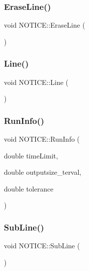 \subsubsection{\texorpdfstring{Erase\+Line()}{EraseLine()}}
{\footnotesize\ttfamily void N\+O\+T\+I\+C\+E\+::\+Erase\+Line (\begin{DoxyParamCaption}{ }\end{DoxyParamCaption})\hspace{0.3cm}{\ttfamily [inline]}}

\mbox{\label{namespace_n_o_t_i_c_e_a9536e3b7bb1f9b6af83b1a5cdf3a56d3}} 
\subsubsection{\texorpdfstring{Line()}{Line()}}
{\footnotesize\ttfamily void N\+O\+T\+I\+C\+E\+::\+Line (\begin{DoxyParamCaption}{ }\end{DoxyParamCaption})\hspace{0.3cm}{\ttfamily [inline]}}

\mbox{\label{namespace_n_o_t_i_c_e_ab85b7138c5f1deaeeedad94b7bad2477}} 
\subsubsection{\texorpdfstring{Run\+Info()}{RunInfo()}}
{\footnotesize\ttfamily void N\+O\+T\+I\+C\+E\+::\+Run\+Info (\begin{DoxyParamCaption}\item[{double}]{time\+Limit,  }\item[{double}]{outputsize\+\_\+terval,  }\item[{double}]{tolerance }\end{DoxyParamCaption})\hspace{0.3cm}{\ttfamily [inline]}}

\mbox{\label{namespace_n_o_t_i_c_e_a782778073f9df89a3d20a7faa16494aa}} 
\subsubsection{\texorpdfstring{Sub\+Line()}{SubLine()}}
{\footnotesize\ttfamily void N\+O\+T\+I\+C\+E\+::\+Sub\+Line (\begin{DoxyParamCaption}{ }\end{DoxyParamCaption})\hspace{0.3cm}{\ttfamily [inline]}}

